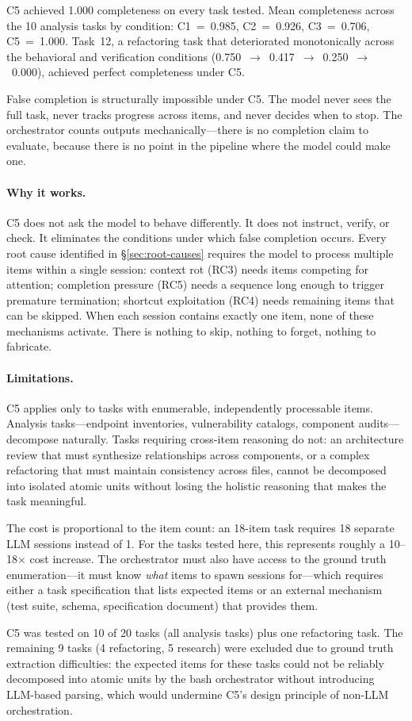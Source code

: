 C5 achieved 1.000 completeness on every task tested. Mean completeness across the 10 analysis tasks by condition: C1~=~0.985, C2~=~0.926, C3~=~0.706, C5~=~1.000. Task~12, a refactoring task that deteriorated monotonically across the behavioral and verification conditions (0.750~$\to$~0.417~$\to$~0.250~$\to$~0.000), achieved perfect completeness under C5.

False completion is structurally impossible under C5. The model never sees the full task, never tracks progress across items, and never decides when to stop. The orchestrator counts outputs mechanically---there is no completion claim to evaluate, because there is no point in the pipeline where the model could make one.

\paragraph{Why it works.}
C5 does not ask the model to behave differently. It does not instruct, verify, or check. It eliminates the conditions under which false completion occurs. Every root cause identified in \S\ref{sec:root-causes} requires the model to process multiple items within a single session: context rot (RC3) needs items competing for attention; completion pressure (RC5) needs a sequence long enough to trigger premature termination; shortcut exploitation (RC4) needs remaining items that can be skipped. When each session contains exactly one item, none of these mechanisms activate. There is nothing to skip, nothing to forget, nothing to fabricate.

\paragraph{Limitations.}
C5 applies only to tasks with enumerable, independently processable items. Analysis tasks---endpoint inventories, vulnerability catalogs, component audits---decompose naturally. Tasks requiring cross-item reasoning do not: an architecture review that must synthesize relationships across components, or a complex refactoring that must maintain consistency across files, cannot be decomposed into isolated atomic units without losing the holistic reasoning that makes the task meaningful.

The cost is proportional to the item count: an 18-item task requires 18 separate LLM sessions instead of 1. For the tasks tested here, this represents roughly a 10--18$\times$ cost increase. The orchestrator must also have access to the ground truth enumeration---it must know \emph{what} items to spawn sessions for---which requires either a task specification that lists expected items or an external mechanism (test suite, schema, specification document) that provides them.

C5 was tested on 10 of 20 tasks (all analysis tasks) plus one refactoring task. The remaining 9 tasks (4 refactoring, 5 research) were excluded due to ground truth extraction difficulties: the expected items for these tasks could not be reliably decomposed into atomic units by the bash orchestrator without introducing LLM-based parsing, which would undermine C5's design principle of non-LLM orchestration.
